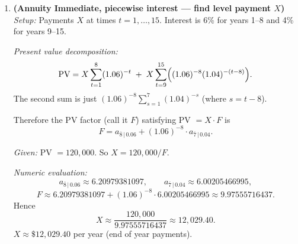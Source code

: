 \documentclass[11pt]{article}
\begin{document}
\begin{enumerate}[leftmargin=*,itemsep=16pt]
  \emph{Value required at time 20:} The \emph{present value at time 20} of the annuity-due of 20 payments of \$30,000 is
  \[
    30{,}000\cdot \ddot a_{\overline{20}\,|\,0.05}
    =30{,}000\cdot\frac{1-(1.05)^{-20}}{d_{0.05}}
    \quad\text{where } d_{0.05}=\frac{0.05}{1.05}.
  \]
  It is often convenient to use \(\ddot a_{\overline{20}}=(1+i)a_{\overline{20}}\), so
  \[
    \ddot a_{\overline{20}\,|\,0.05}=(1.05)\cdot\frac{1-(1.05)^{-20}}{0.05}.
  \]

  \emph{Accumulation of the deposits to time 20:} Deposits \(D\) at times \(0,1,\dots,19\) accumulate to time 20 to
  \[
    D\cdot(1.05)\,s_{\overline{20}\,|\,0.05},
  \]
  because the accumulation of an annuity-due of \(n\) deposits to time \(n\) is \((1+i)s_n\).

  \emph{Equation:} Equate accumulation of deposits to the amount required at time 20:
  \[
    D\cdot(1.05)\,s_{\overline{20}\,|\,0.05}
    =30{,}000\cdot\ddot a_{\overline{20}\,|\,0.05}.
  \]
  Hence
  \[
    D=\frac{30{,}000\cdot\ddot a_{\overline{20}\,|\,0.05}}{(1.05)\,s_{\overline{20}\,|\,0.05}}.
  \]

  \emph{Numeric evaluation:} At \(i=0.05\),
  \[
    \ddot a_{\overline{20}\,|\,0.05}\approx 13.0853208597,\qquad
    s_{\overline{20}\,|\,0.05}\approx 33.0659541029.
  \]
  Thus
  \[
    D\approx \frac{30{,}000\cdot 13.0853208597}{1.05\cdot 33.0659541029}
     \approx 11{,}306.68.
  \]
  \(\boxed{D\approx \$11{,}306.68}\) (each beginning-of-year deposit).

\bigskip

\item \textbf{(Annuity Immediate, piecewise interest — find level payment \(X\))}\\[4pt]
  \emph{Setup:} Payments \(X\) at times \(t=1,\dots,15\). Interest is 6\% for years 1–8 and 4\% for years 9–15.

  \emph{Present value decomposition:}
  \[
    \text{PV} = X\sum_{t=1}^{8}(1.06)^{-t}
      \;+\; X\sum_{t=9}^{15}\Bigl((1.06)^{-8}(1.04)^{-(t-8)}\Bigr).
  \]
  The second sum is just \((1.06)^{-8}\sum_{s=1}^{7}(1.04)^{-s}\) (where \(s=t-8\)).

  Therefore the PV factor (call it \(F\)) satisfying PV \(=X\cdot F\) is
  \[
    F = a_{\overline{8}\,|\,0.06} + (1.06)^{-8}\cdot a_{\overline{7}\,|\,0.04}.
  \]

  \emph{Given:} PV \(=120{,}000\). So \(X = 120{,}000 / F.\)

  \emph{Numeric evaluation:}
  \[
    a_{\overline{8}\,|\,0.06}\approx 6.20979381097,\qquad
    a_{\overline{7}\,|\,0.04}\approx 6.00205466995,
  \]
  \[
    F \approx 6.20979381097 + (1.06)^{-8}\cdot 6.00205466995
      \approx 9.97555716437.
  \]
  Hence
  \[
    X \approx \frac{120{,}000}{9.97555716437}
      \approx 12{,}029.40.
  \]
  \(\boxed{X\approx \$12{,}029.40}\) per year (end of year payments).


\end{enumerate}
\end{document}
